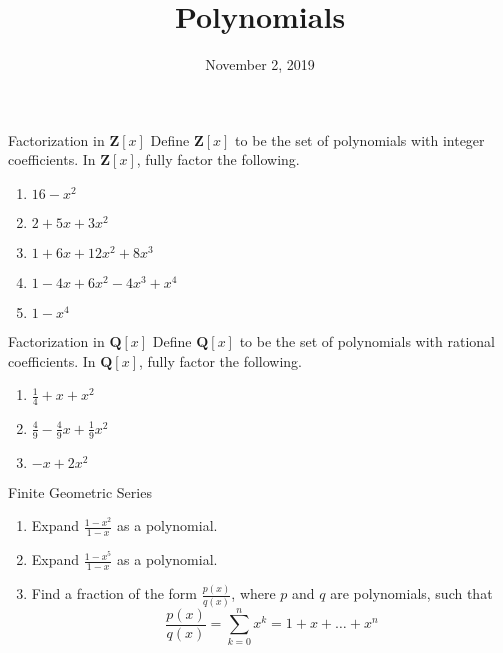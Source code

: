 \documentclass[12pt,letterpaper]{article}
\title{Polynomials}
\date{November 2, 2019}
\begin{document}
\maketitle

\thispagestyle{empty}


\begin{problem}{Factorization in \(\mathbf{Z}[x]\)}
  Define \(\mathbf{Z}[x]\) to be the set of polynomials with integer
  coefficients. In \(\mathbf{Z}[x]\), fully factor the following.

  \begin{enumerate}
    \item \(16 - x^2\)
    \item \(2 + 5x + 3x^2\)
    \item \(1 + 6x + 12x^2 + 8x^3\)
    \item \(1 - 4x + 6x^2 - 4x^3 + x^4\)
    \item \(1 - x^4\)
  \end{enumerate}
\end{problem}

\begin{problem}{Factorization in \(\mathbf{Q}[x]\)}
  Define \(\mathbf{Q}[x]\) to be the set of polynomials with rational
  coefficients. In \(\mathbf{Q}[x]\), fully factor the following.

  \begin{enumerate}
    \item \(\frac{1}{4} + x + x^2\)
    \item \(\frac{4}{9} - \frac{4}{9}x + \frac{1}{9}x^2\)
    \item \(-x + 2x^2\)
  \end{enumerate}
\end{problem}

\begin{problem}{Finite Geometric Series}
  \begin{enumerate}
    \item Expand \(\frac{1-x^2}{1-x}\) as a polynomial.
    \item Expand \(\frac{1-x^5}{1-x}\) as a polynomial.
    \item Find a fraction of the form \(\frac{p(x)}{q(x)}\), where \(p\) and
    \(q\) are polynomials, such that \[
      \frac{p(x)}{q(x)} = \sum_{k=0}^n x^k = 1 + x + \dots + x^n
    \]
  \end{enumerate}
\end{problem}
\end{document}
